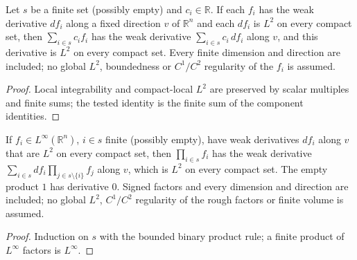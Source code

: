 \begin{lemma}
  \label{lem:weak-finite-linear-combination}
  \leanok
  Let $s$ be a finite set (possibly empty) and $c_i\in\mathbb R$. If each $f_i$ has the weak derivative $df_i$ along a fixed
  direction $v$ of $\mathbb R^n$ and each $df_i$ is $L^2$ on every compact set, then $\sum_{i\in s}c_if_i$ has the weak derivative
  $\sum_{i\in s}c_i\,df_i$ along $v$, and this derivative is $L^2$ on every compact set. Every finite dimension and direction are
  included; no global $L^2$, boundedness or $C^1/C^2$ regularity of the $f_i$ is assumed.
\end{lemma}
\begin{proof}
  \leanok
  Local integrability and compact-local $L^2$ are preserved by scalar multiples and finite sums; the tested identity is the finite
  sum of the component identities.
\end{proof}

\begin{lemma}
  \label{lem:weak-finite-product}
  \leanok
  If $f_i\in L^\infty(\mathbb R^n)$, $i\in s$ finite (possibly empty), have weak derivatives $df_i$ along $v$ that are $L^2$ on every
  compact set, then $\prod_{i\in s}f_i$ has the weak derivative $\sum_{i\in s}df_i\prod_{j\in s\setminus\{i\}}f_j$ along $v$, which
  is $L^2$ on every compact set. The empty product $1$ has derivative $0$. Signed factors and every dimension and direction are
  included; no global $L^2$, $C^1/C^2$ regularity of the rough factors or finite volume is assumed.
\end{lemma}
\begin{proof}
  \leanok
  Induction on $s$ with the bounded binary product rule; a finite product of $L^\infty$ factors is $L^\infty$.
\end{proof}

